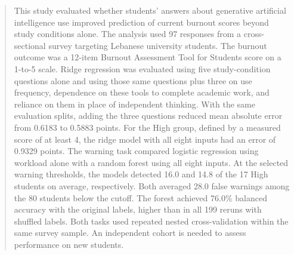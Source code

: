 \begin{abstract}
This study evaluated whether students' answers about generative artificial intelligence use improved prediction of current burnout scores beyond study conditions alone. The analysis used 97 responses from a cross-sectional survey targeting Lebanese university students. The burnout outcome was a 12-item Burnout Assessment Tool for Students score on a 1-to-5 scale. Ridge regression was evaluated using five study-condition questions alone and using those same questions plus three on use frequency, dependence on these tools to complete academic work, and reliance on them in place of independent thinking. With the same evaluation splits, adding the three questions reduced mean absolute error from 0.6183 to 0.5883 points. For the High group, defined by a measured score of at least 4, the ridge model with all eight inputs had an error of 0.9329 points. The warning task compared logistic regression using workload alone with a random forest using all eight inputs. At the selected warning thresholds, the models detected 16.0 and 14.8 of the 17 High students on average, respectively. Both averaged 28.0 false warnings among the 80 students below the cutoff. The forest achieved 76.0\% balanced accuracy with the original labels, higher than in all 199 reruns with shuffled labels. Both tasks used repeated nested cross-validation within the same survey sample. An independent cohort is needed to assess performance on new students.
\end{abstract}
